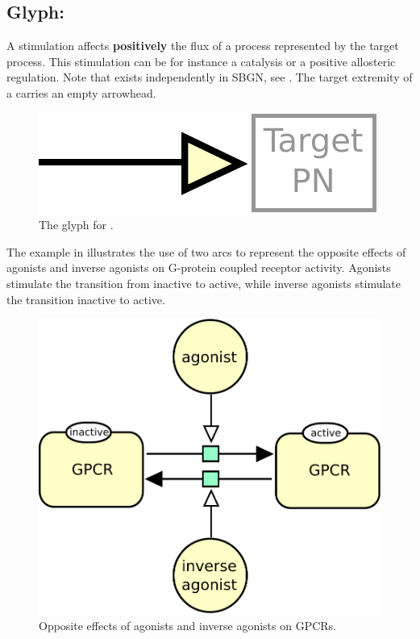 
\subsection{Glyph: }\label{sec:stimulation}

A stimulation affects \textbf{positively} the flux of a process represented by the target process. This stimulation can be for instance a catalysis or a positive allosteric regulation. Note that  exists independently in SBGN, see . The target extremity of a  carries an empty arrowhead.

\begin{figure}[H]
  \centering
  \includegraphics[scale = 0.5]{images/stimulation}
  \caption{The \PD glyph for .}
  \label{fig:stimulation}
\end{figure}

The example in  illustrates the use of two  arcs to represent the opposite effects of agonists and inverse agonists on G-protein coupled receptor activity. Agonists stimulate the transition from inactive to active, while inverse agonists stimulate the transition inactive to active.

\begin{figure}[H]
  \centering
  \includegraphics[scale = 0.5]{images/stimulation-reversible}
  \caption{Opposite effects of agonists and inverse agonists on GPCRs.}
  \label{fig:stimulation-reversible}
\end{figure}
